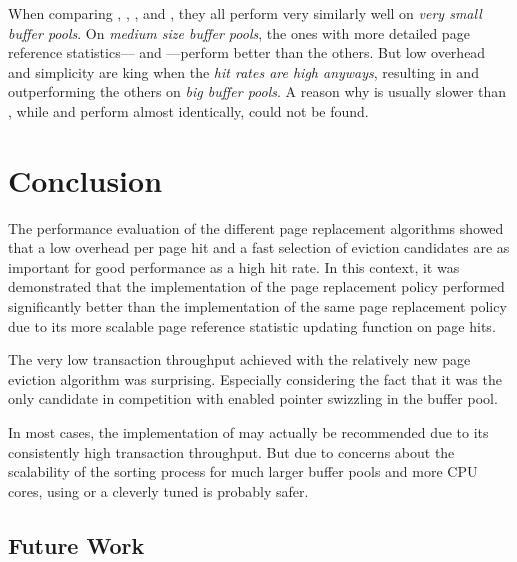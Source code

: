     When comparing , , , and , they all perform very similarly well on \emph{very small buffer pools}. On \emph{medium size buffer pools}, the ones with more detailed page reference statistics--- and ---perform better than the others. But low overhead and simplicity are king when the \emph{hit rates are high anyways}, resulting in  and  outperforming the others on \emph{big buffer pools}. A reason why  is usually slower than , while  and  perform almost identically, could not be found.

\section{Conclusion} \label{sec:page_evictioners_outro}

    The performance evaluation of the different page replacement algorithms showed that a low overhead per page hit and a fast selection of eviction candidates are as important for good performance as a high hit rate. In this context, it was demonstrated that the  implementation of the  page replacement policy performed significantly better than the  implementation of the same page replacement policy due to its more scalable page reference statistic updating function on page hits.

    The very low transaction throughput achieved with the relatively new  page eviction algorithm was surprising. Especially considering the fact that it was the only candidate in competition with enabled pointer swizzling in the buffer pool.

    In most cases, the  implementation of  may actually be recommended due to its consistently high transaction throughput. But due to concerns about the scalability of the sorting process for much larger buffer pools and more CPU cores, using  or a cleverly tuned  is probably safer.

\subsection{Future Work} \label{subsec:page_evictioners_future}

